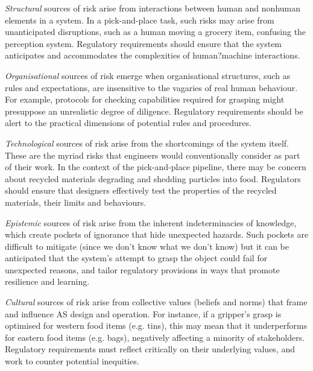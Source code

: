 \documentclass[letterpaper, 10 pt, conference]{ieeeconf}  %
\begin{document}
	\emph{Structural} sources of risk arise from interactions between human and nonhuman elements in a system.
	In a pick-and-place task, such risks may arise from unanticipated disruptions, such as a human moving a grocery item, confusing the perception system. Regulatory requirements should ensure that the system anticipates and accommodates the complexities of human?machine interactions.
	
	\emph{Organisational} sources of risk emerge when organisational structures, such as rules and expectations, are insensitive to the vagaries of real human behaviour. For example, protocols for checking capabilities required for grasping might presuppose an unrealistic degree of diligence. Regulatory requirements should be alert to the practical dimensions of potential rules and procedures.
	
	\emph{Technological} sources of risk arise from the shortcomings of the system itself. These are the myriad risks that engineers would conventionally consider as part of their work. In the context of the pick-and-place pipeline, there may be concern about recycled materials degrading and shedding particles into food. Regulators should ensure that designers effectively test the properties of the recycled materials, their limits and behaviours.
	
	\emph{Epistemic} sources of risk arise from the inherent indeterminacies of knowledge, which create pockets of ignorance that hide unexpected hazards. Such pockets are difficult to mitigate (since we don't know what we don't know) but it can be anticipated that the system's attempt to grasp the object could fail for unexpected reasons, and tailor regulatory provisions in ways that promote resilience and learning. 
	
	\emph{Cultural} sources of risk arise from collective values (beliefs and norms) that frame and influence AS design and operation. For instance, if a gripper's grasp is optimised for western food items (e.g. tins), this may mean that it underperforms for eastern food items (e.g. bags), negatively affecting a minority of stakeholders. Regulatory requirements must reflect critically on their underlying values, and work to counter potential inequities. 
	
\end{document}

